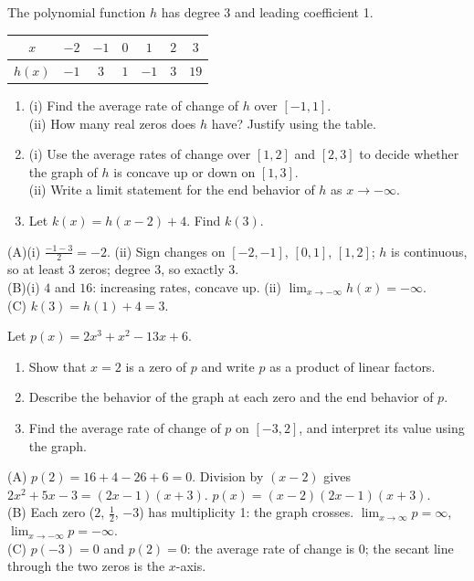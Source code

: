\begin{exo}{}
The polynomial function $h$ has degree 3 and leading coefficient 1.
\begin{center}\begin{tabular}{c|cccccc}$x$&$-2$&$-1$&$0$&$1$&$2$&$3$\\\hline$h(x)$&$-1$&$3$&$1$&$-1$&$3$&$19$\end{tabular}\end{center}
\begin{enumerate}[label=(\Alph*)]
\item (i) Find the average rate of change of $h$ over $[-1,1]$.\\ (ii) How many real zeros does $h$ have? Justify using the table.
\item (i) Use the average rates of change over $[1,2]$ and $[2,3]$ to decide whether the graph of $h$ is concave up or down on $[1,3]$.\\ (ii) Write a limit statement for the end behavior of $h$ as $x\to-\infty$.
\item Let $k(x)=h(x-2)+4$. Find $k(3)$.
\end{enumerate}
\begin{solution}
(A)(i) $\frac{-1-3}{2}=-2$. (ii) Sign changes on $[-2,-1]$, $[0,1]$, $[1,2]$; $h$ is continuous, so at least 3 zeros; degree 3, so exactly 3.\\
(B)(i) $4$ and $16$: increasing rates, concave up. (ii) $\lim_{x\to-\infty}h(x)=-\infty$.\\
(C) $k(3)=h(1)+4=3$.
\end{solution}
\end{exo}
\begin{exo}{}
Let $p(x)=2x^3+x^2-13x+6$.
\begin{enumerate}[label=(\Alph*)]
\item Show that $x=2$ is a zero of $p$ and write $p$ as a product of linear factors.
\item Describe the behavior of the graph at each zero and the end behavior of $p$.
\item Find the average rate of change of $p$ on $[-3,2]$, and interpret its value using the graph.
\end{enumerate}
\begin{solution}
(A) $p(2)=16+4-26+6=0$. Division by $(x-2)$ gives $2x^2+5x-3=(2x-1)(x+3)$. $p(x)=(x-2)(2x-1)(x+3)$.\\
(B) Each zero ($2$, $\frac12$, $-3$) has multiplicity 1: the graph crosses. $\lim_{x\to\infty}p=\infty$, $\lim_{x\to-\infty}p=-\infty$.\\
(C) $p(-3)=0$ and $p(2)=0$: the average rate of change is $0$; the secant line through the two zeros is the $x$-axis.
\end{solution}
\end{exo}

